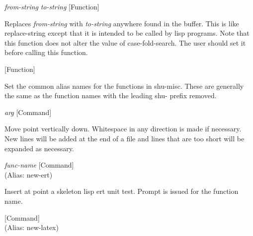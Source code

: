 \vspace{1em}
\noindent
{}
\usebox{\funcname}\emph{from-string} \emph{to-string}
 \hfill [Function]

\begin{doc-string}
Replaces \emph{from-string} with \emph{to-string} anywhere found in the buffer.
This is like replace-string except that it is intended to be called
by lisp programs.  Note that this function does not alter the value of
case-fold-search.  The user should set it before calling this function.
\end{doc-string}

\vspace{1em}
\noindent
{}
\usebox{\funcname}
 \hfill [Function]

\begin{doc-string}
Set the common alias names for the functions in shu-misc.
These are generally the same as the function names with the leading
shu- prefix removed.
\end{doc-string}

\vspace{1em}
\noindent
{}
\usebox{\funcname}\emph{arg}
 \hfill [Command]

\begin{doc-string}
Move point vertically down.  Whitespace in any direction is made if
necessary.  New lines will be added at the end of a file and lines that are
too short will be expanded as necessary.
\end{doc-string}

\vspace{1em}
\noindent
{}
\usebox{\funcname}\emph{func-name}
 \hfill [Command]\\%
 (Alias: new-ert)

\begin{doc-string}
Insert at point a skeleton lisp ert unit test.  Prompt is issued for the
function name.
\end{doc-string}

\vspace{1em}
\noindent
{}
\usebox{\funcname}
 \hfill [Command]\\%
 (Alias: new-latex)

